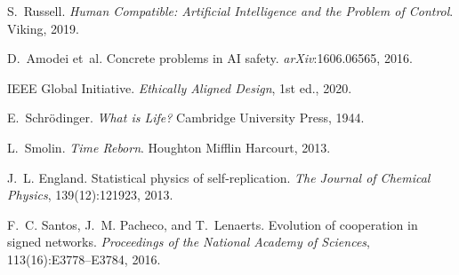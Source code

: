\documentclass[11pt]{article}
\begin{document}
\begin{thebibliography}{99}
S.~Russell.
\newblock \emph{Human Compatible: Artificial Intelligence and the Problem of Control}.
\newblock Viking, 2019.

D.~Amodei et~al.
\newblock Concrete problems in AI safety.
\newblock \emph{arXiv}:1606.06565, 2016.

IEEE Global Initiative.
\newblock \emph{Ethically Aligned Design}, 1st ed., 2020.

E.~Schr{\"o}dinger.
\newblock \emph{What is Life?}
\newblock Cambridge University Press, 1944.

L.~Smolin.
\newblock \emph{Time Reborn}.
\newblock Houghton Mifflin Harcourt, 2013.

J.~L. England.
\newblock Statistical physics of self-replication.
\newblock \emph{The Journal of Chemical Physics}, 139(12):121923, 2013.

F.~C. Santos, J.~M. Pacheco, and T.~Lenaerts.
\newblock Evolution of cooperation in signed networks.
\newblock \emph{Proceedings of the National Academy of Sciences}, 113(16):E3778--E3784, 2016.

\end{thebibliography}
\end{document}
